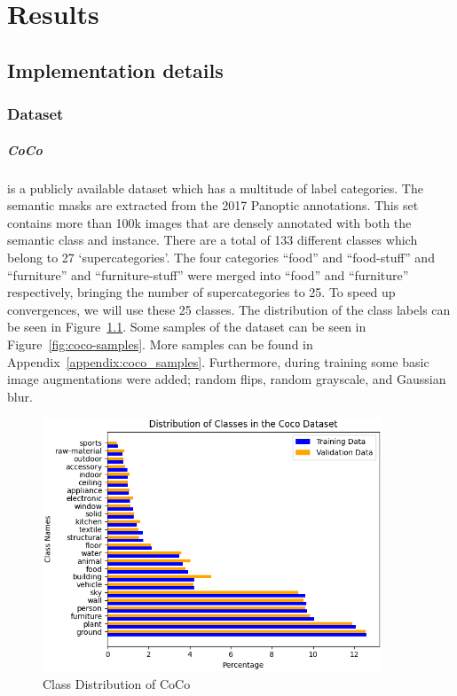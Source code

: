\chapter{Results}\label{chapter:experiments}

\section{Implementation details}
\subsection{Dataset}
\paragraph{CoCo~\cite{lin2015microsoftcococommonobjects}} is a publicly available dataset which has a multitude of label categories. The semantic masks are extracted from the 2017 Panoptic annotations. This set contains more than 100k images that are densely annotated with both the semantic class and instance. There are a total of 133 different classes which belong to 27 `supercategories'. The four categories ``food'' and ``food-stuff'' and ``furniture'' and ``furniture-stuff'' were merged into ``food'' and ``furniture'' respectively, bringing the number of supercategories to 25. To speed up convergences, we will use these 25 classes. The distribution of the class labels can be seen in Figure~\ref{fig:coco-class-distribution}. Some samples of the dataset can be seen in Figure~\ref{fig:coco-samples}. More samples can be found in Appendix~\ref{appendix:coco_samples}. Furthermore, during training some basic image augmentations were added; random flips, random grayscale, and Gaussian blur.


\begin{figure}[h]
    \centering
    \includegraphics[width=0.9\textwidth]{figures/datasets/coco/class_distribution.png}
    \caption{Class Distribution of CoCo}
    \label{fig:coco-class-distribution}
\end{figure}

